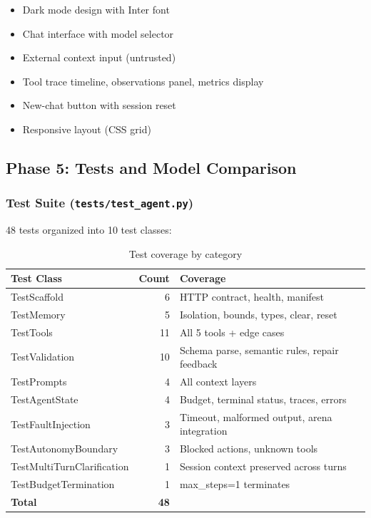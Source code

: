 \documentclass[12pt,a4paper]{article}
\begin{document}
\begin{itemize}
  \item Dark mode design with Inter font
  \item Chat interface with model selector
  \item External context input (untrusted)
  \item Tool trace timeline, observations panel, metrics display
  \item New-chat button with session reset
  \item Responsive layout (CSS grid)
\end{itemize}

\subsection{Phase 5: Tests and Model Comparison}

\subsubsection{Test Suite (\texttt{tests/test\_agent.py})}

48 tests organized into 10 test classes:

\begin{table}[H]
\centering
\begin{tabular}{@{}lrl@{}}
\toprule
Test Class & Count & Coverage \\
\midrule
TestScaffold & 6 & HTTP contract, health, manifest \\
TestMemory & 5 & Isolation, bounds, types, clear, reset \\
TestTools & 11 & All 5 tools + edge cases \\
TestValidation & 10 & Schema parse, semantic rules, repair feedback \\
TestPrompts & 4 & All context layers \\
TestAgentState & 4 & Budget, terminal status, traces, errors \\
TestFaultInjection & 3 & Timeout, malformed output, arena integration \\
TestAutonomyBoundary & 3 & Blocked actions, unknown tools \\
TestMultiTurnClarification & 1 & Session context preserved across turns \\
TestBudgetTermination & 1 & max\_steps=1 terminates \\
\midrule
\textbf{Total} & \textbf{48} & \\
\bottomrule
\end{tabular}
\caption{Test coverage by category}
\end{table}
\end{document}
